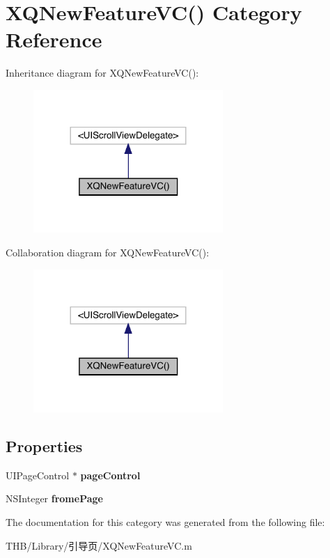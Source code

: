 \hypertarget{category_x_q_new_feature_v_c_07_08}{}\section{X\+Q\+New\+Feature\+VC() Category Reference}
\label{category_x_q_new_feature_v_c_07_08}


Inheritance diagram for X\+Q\+New\+Feature\+VC()\+:\nopagebreak
\begin{figure}[H]
\begin{center}
\leavevmode
\includegraphics[width=204pt]{category_x_q_new_feature_v_c_07_08__inherit__graph}
\end{center}
\end{figure}


Collaboration diagram for X\+Q\+New\+Feature\+VC()\+:\nopagebreak
\begin{figure}[H]
\begin{center}
\leavevmode
\includegraphics[width=204pt]{category_x_q_new_feature_v_c_07_08__coll__graph}
\end{center}
\end{figure}
\subsection*{Properties}
\begin{DoxyCompactItemize}
\item 
\mbox{\label{category_x_q_new_feature_v_c_07_08_a3fbf2591a66f0465c3262269355d5cc8}} 
U\+I\+Page\+Control $\ast$ {\bfseries page\+Control}
\item 
\mbox{\label{category_x_q_new_feature_v_c_07_08_a862f9b68dd038aa798787c439b2f5513}} 
N\+S\+Integer {\bfseries frome\+Page}
\end{DoxyCompactItemize}


The documentation for this category was generated from the following file\+:\begin{DoxyCompactItemize}
\item 
T\+H\+B/\+Library/引导页/X\+Q\+New\+Feature\+V\+C.\+m\end{DoxyCompactItemize}
